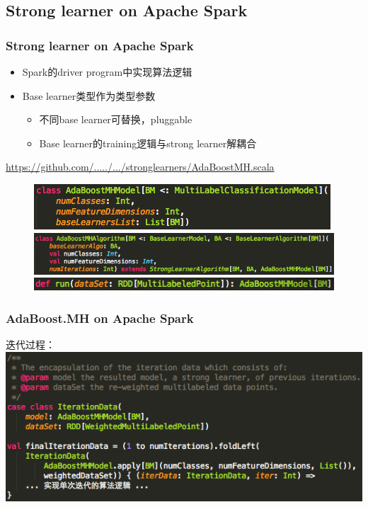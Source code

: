 \documentclass{beamer}
\begin{document}
\subsection{Strong learner on Apache Spark}

\begin{frame}
\frametitle{Strong learner on Apache Spark}
\begin{itemize}
\item Spark的driver program中实现算法逻辑
\item Base learner类型作为类型参数
  \begin{itemize}
    \item 不同base learner可替换，pluggable
    \item Base learner的training逻辑与strong learner解耦合
  \end{itemize}
\end{itemize}
{ \footnotesize
\href{https://github.com/BaiGang/spark_multiboost/blob/master/src/main/scala/org/apache/spark/mllib/classification/multilabel/stronglearners/AdaBoostMH.scala}{https://github.com/...../.../stronglearners/AdaBoostMH.scala}
}
\begin{figure}
\includegraphics[scale=0.5,left]{img/adbm_model_spark.png} \\
\includegraphics[scale=0.5,left]{img/adbm_algo_spark.png} \\
\includegraphics[scale=0.5,left]{img/adbm_run.png}
\end{figure}
\end{frame}

\begin{frame}
\frametitle{AdaBoost.MH on Apache Spark}
迭代过程：
\includegraphics[scale=0.5,left]{img/iteration.png}
\end{frame}
\end{document}
